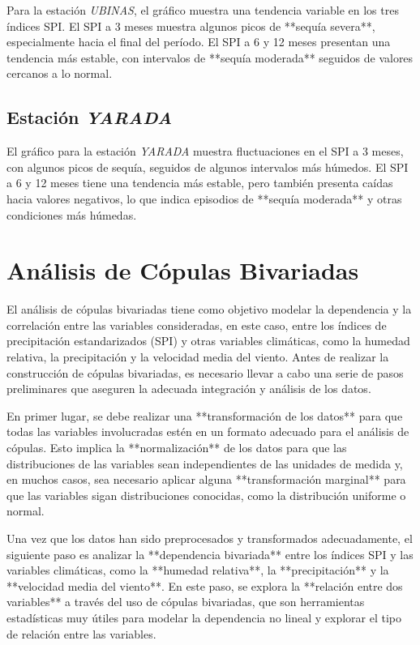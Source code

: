 Para la estación \textit{UBINAS}, el gráfico muestra una tendencia variable en los tres índices SPI. El SPI a 3 meses muestra algunos picos de **sequía severa**, especialmente hacia el final del período. El SPI a 6 y 12 meses presentan una tendencia más estable, con intervalos de **sequía moderada** seguidos de valores cercanos a lo normal.

\subsection*{Estación \textit{YARADA}}

El gráfico para la estación \textit{YARADA} muestra fluctuaciones en el SPI a 3 meses, con algunos picos de sequía, seguidos de algunos intervalos más húmedos. El SPI a 6 y 12 meses tiene una tendencia más estable, pero también presenta caídas hacia valores negativos, lo que indica episodios de **sequía moderada** y otras condiciones más húmedas.

\section{Análisis de Cópulas Bivariadas}

El análisis de cópulas bivariadas tiene como objetivo modelar la dependencia y la correlación entre las variables consideradas, en este caso, entre los índices de precipitación estandarizados (SPI) y otras variables climáticas, como la humedad relativa, la precipitación y la velocidad media del viento. Antes de realizar la construcción de cópulas bivariadas, es necesario llevar a cabo una serie de pasos preliminares que aseguren la adecuada integración y análisis de los datos.

En primer lugar, se debe realizar una **transformación de los datos** para que todas las variables involucradas estén en un formato adecuado para el análisis de cópulas. Esto implica la **normalización** de los datos para que las distribuciones de las variables sean independientes de las unidades de medida y, en muchos casos, sea necesario aplicar alguna **transformación marginal** para que las variables sigan distribuciones conocidas, como la distribución uniforme o normal.

Una vez que los datos han sido preprocesados y transformados adecuadamente, el siguiente paso es analizar la **dependencia bivariada** entre los índices SPI y las variables climáticas, como la **humedad relativa**, la **precipitación** y la **velocidad media del viento**. En este paso, se explora la **relación entre dos variables** a través del uso de cópulas bivariadas, que son herramientas estadísticas muy útiles para modelar la dependencia no lineal y explorar el tipo de relación entre las variables.

